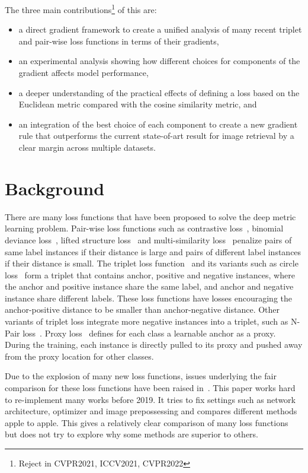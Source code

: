 \documentclass[10pt,twocolumn,letterpaper]{article}
\begin{document}
The three main contributions\footnote{Reject in CVPR2021, ICCV2021, CVPR2022} of this are:
\begin{itemize}
    \item a direct gradient framework to create a unified analysis of many recent triplet and pair-wise loss functions in terms of their gradients,
    \item an experimental analysis showing how different choices for components of the gradient affects model performance,
    \item a deeper understanding of the practical effects of defining a loss based on the Euclidean metric compared with the cosine similarity metric, and
    \item an integration of the best choice of each component to create a new gradient rule that outperforms the current state-of-art result for image retrieval by a clear margin across multiple datasets.
\end{itemize}

\section{Background}
There are many loss functions that have been proposed to solve the deep metric learning problem. Pair-wise loss functions such as contrastive loss~\cite{hadsell2006dimensionality}, binomial deviance loss~\cite{yi2014deep}, lifted structure loss~\cite{SOP} and multi-similarity loss~\cite{wang2019multi} penalize pairs of same label instances if their distance is large and pairs of different label instances if their distance is small.  The triplet loss function~\cite{hoffer2015deep,facenet} and its variants such as circle loss~\cite{Sun_2020_CVPR} form a triplet that contains anchor, positive and negative instances, where the anchor and positive instance share the same label, and anchor and negative instance share different labels. These loss functions have losses encouraging the anchor-positive distance to be smaller than anchor-negative distance.  Other variants of triplet loss integrate more negative instances into a triplet, such as N-Pair loss~\cite{Npairs}.  Proxy loss~\cite{Proxy} defines for each class a learnable anchor as a proxy. During the training, each instance is directly pulled to its proxy and pushed away from the proxy location for other classes.

Due to the explosion of many new loss functions, issues underlying the fair comparison for these loss functions have been raised in~\cite{musgrave2020metric}. This paper works hard to re-implement many works before 2019. It tries to fix settings such as network architecture, optimizer and image prepossessing and compares different methods apple to apple.  This gives a relatively clear comparison of many loss functions but does not try to explore why some methods are superior to others. 
\end{document}
